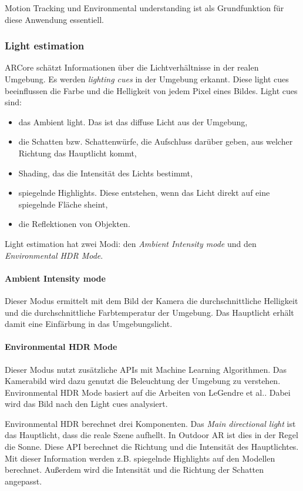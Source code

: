 Motion Tracking und Environmental understanding ist als Grundfunktion für diese Anwendung essentiell.

\subsubsection{Light estimation}
\label{technische-umsetzung-arcore-light-estimation}
ARCore schätzt Informationen über die Lichtverhältnisse in der realen Umgebung. Es werden \textit{lighting cues} in der Umgebung erkannt. Diese light cues beeinflussen die Farbe und die Helligkeit von jedem Pixel eines Bildes. Light cues sind:
\begin{itemize}
    \item das Ambient light. Das ist das diffuse Licht aus der Umgebung, 
    \item die Schatten bzw. Schattenwürfe, die Aufschluss darüber geben, aus welcher Richtung das Hauptlicht kommt,
    \item Shading, das die Intensität des Lichts bestimmt,
    \item spiegelnde Highlights. Diese entstehen, wenn das Licht direkt auf eine spiegelnde Fläche sheint,
    \item die Reflektionen von Objekten.
\end{itemize}

Light estimation hat zwei Modi: den \textit{Ambient Intensity mode} und den \textit{Environmental HDR Mode}.

\paragraph*{Ambient Intensity mode}
Dieser Modus ermittelt mit dem Bild der Kamera die durchschnittliche Helligkeit und die durchschnittliche Farbtemperatur der Umgebung. Das Hauptlicht erhält damit eine Einfärbung in das Umgebungslicht.

\paragraph*{Environmental HDR Mode} Dieser Modus nutzt zusätzliche APIs mit Machine Learning Algorithmen. Das Kamerabild wird dazu genutzt die Beleuchtung der Umgebung zu verstehen. Environmental HDR Mode basiert auf die Arbeiten von LeGendre et al.\cite*{LeGendre2019}. Dabei wird das Bild nach den Light cues analysiert. 

Environmental HDR berechnet drei Komponenten. Das \textit{Main directional light} ist das Hauptlicht, dass die reale Szene aufhellt. In Outdoor AR ist dies in der Regel die Sonne. Diese API berechnet die Richtung und die Intensität des Hauptlichtes. Mit dieser Information werden z.B. spiegelnde Highlights auf den Modellen berechnet. Außerdem wird die Intensität und die Richtung der Schatten angepasst. 

